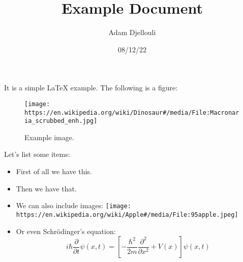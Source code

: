 \documentclass[12pt]{article}
\title{Example Document}
\author{Adam Djellouli}
\date{08/12/22}
\begin{document}
\maketitle

It is a simple \LaTeX{} example. The following is a figure:

\begin{figure}[ht]
	\centering
	\texttt{[image: https://en.wikipedia.org/wiki/Dinosaur\#/media/File:Macronaria\_scrubbed\_enh.jpg]}
	\caption{Example image.}
\end{figure}

Let's list some items:

\begin{itemize}
	\item First of all we have this.
	\item Then we have that.
	\item We can also include images:
	      \newline
	      \hspace*{3em}
	      \texttt{[image: https://en.wikipedia.org/wiki/Apple\#/media/File:95apple.jpeg]}
	\item Or even Schr\"odinger's equation:
	      \begin{equation}
	      	i\hbar\frac{\partial}{\partial t}\psi(x,t) = \left[-\frac{\hbar^2}{2m}\frac{\partial^2}{\partial x^2} + V(x)\right]\psi(x,t)
	      \end{equation}
\end{itemize}
\end{document}
